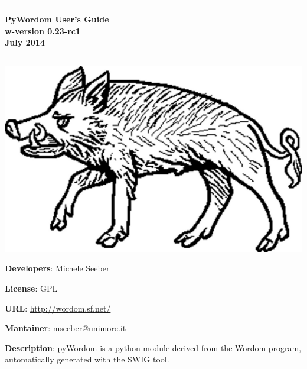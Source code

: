 \documentclass[11pt,twoside,onecolumn,a4paper,openright,notitlepage]{book}[2001/04/21]
\begin{document}

\begin{titlepage}
\begin{center}
\rule[1cm]{15cm}{0.05cm}
\bfseries {\huge PyWordom User's Guide}\\ \vspace{0.4cm}
          {\large w-version 0.23-rc1}\\ \vspace{0.2cm}
          {\large July 2014}
\rule[-0.5cm]{15cm}{0.051cm}

\vspace{2.25cm}
\includegraphics[scale=0.75]{images/wlogo.pdf}
\end{center}
\vspace{2.25cm}
%
\noindent\textbf{\large Developers}: Michele Seeber
\vspace{0.3cm}

\noindent\textbf{\large License}: GPL
\vspace{0.3cm}

\noindent\textbf{\large URL}: \url{http://wordom.sf.net/}
\vspace{0.3cm}

\noindent\textbf{\large Mantainer}: \href{mailto:mseeber@unimore.it}{mseeber@unimore.it}
\vspace{0.3cm}

\noindent\textbf{\large Description}: pyWordom is a python module derived from the Wordom program, automatically generated with the SWIG tool. 
\end{titlepage}
\thispagestyle{plain}
\cleardoublepage
\end{document}
